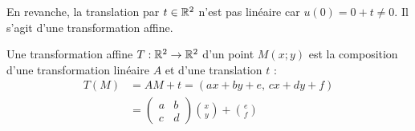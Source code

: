 







		En revanche, la translation par $t\in\mathbb{R}^2$ n'est pas linéaire car $u(0) = 0 + t \neq 0$. Il s'agit d'une transformation affine.
		\begin{definition}
			\label{def-2-transfAffine}
			Une transformation affine $T:\mathbb{R}^2\to\mathbb{R}^2$ d'un point $M(x;y)$ est la composition d'une transformation linéaire $A$ et d'une translation $t$ :
			\begin{align}
				\label{eq-2-transAffine}
				T(M) &= AM + t = (ax + by +e,\,cx + dy + f)	\\
				&= \begin{pmatrix}
					a & b \\ c & d
				\end{pmatrix}
				\binom{x}{y} + \binom{e}{f}
			\end{align}
		\end{definition}

